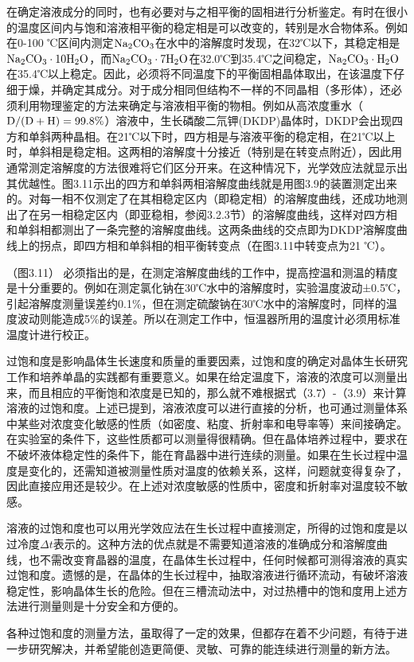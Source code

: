 在确定溶液成分的同时，也有必要对与之相平衡的固相进行分析鉴定。有时在很小的温度区间内与饱和溶液相平衡的稳定相是可以改变的，转别是水合物体系。例如在0-100 ℃区间内测定$\rm Na_2CO_3$在水中的溶解度时发现，在32℃以下，其稳定相是$\rm Na_2CO_3\cdot 10H_2O$，而$\rm Na_2CO_3\cdot 7H_2O$在32.0℃到35.4℃之间稳定，$\rm Na_2CO_3\cdot H_2O$在35.4℃以上稳定。因此，必须将不同温度下的平衡固相晶体取出，在该温度下仔细于燥，并确定其成分。对于成分相同但结构不一样的不同晶相（多形体），还必须利用物理鉴定的方法来确定与溶液相平衡的物相。例如从高浓度重水（$\rm D/(D+H)=99.8\%$）溶液中，生长磷酸二氘钾(DKDP)晶体时，DKDP会出现四方和单斜两种晶相。在21℃以下时，四方相是与溶液平衡的稳定相，在21℃以上时，单斜相是稳定相。这两相的溶解度十分接近（特别是在转变点附近），因此用通常测定溶解度的方法很难将它们区分开来。在这种情况下，光学效应法就显示出其优越性。图3.11示出的四方和单斜两相溶解度曲线就是用图3.9的装置测定出来的。对每一相不仅测定了在其相稳定区内（即稳定相）的溶解度曲线，还成功地测出了在另一相稳定区内（即亚稳相，参阅3.2.3节）的溶解度曲线，这样对四方相和单斜相都测出了一条完整的溶解度曲线。这两条曲线的交点即为DKDP溶解度曲线上的拐点，即四方相和单斜相的相平衡转变点（在图3.11中转变点为21 ℃）。

（图3.11）
必须指出的是，在测定溶解度曲线的工作中，提高控温和测温的精度是十分重要的。例如在测定氯化钠在30℃水中的溶解度时，实验温度波动±0.5℃，引起溶解度测量误差约0.1\%，但在测定硫酸钠在30℃水中的溶解度时，同样的温度波动则能造成5\%的误差。所以在测定工作中，恒温器所用的温度计必须用标准温度计进行校正。

过饱和度是影响晶体生长速度和质量的重要因素，过饱和度的确定对晶体生长研究工作和培养单晶的实践都有重要意义。如果在给定温度下，溶液的浓度可以测量出来，而且相应的平衡饱和浓度是已知的，那么就不难根据式（3.7）-（3.9）来计算溶液的过饱和度。上述已提到，溶液浓度可以进行直接的分析，也可通过测量体系中某些对浓度变化敏感的性质（如密度、粘度、折射率和电导率等）来间接确定。在实验室的条件下，这些性质都可以测量得很精确。但在晶体培养过程中，要求在不破坏液体稳定性的条件下，能在育晶器中进行连续的测量。如果在生长过程中温度是变化的，还需知道被测量性质对温度的依赖关系，这样，问题就变得复杂了，因此直接应用还是较少。在上述对浓度敏感的性质中，密度和折射率对温度较不敏感。

溶液的过饱和度也可以用光学效应法在生长过程中直接测定，所得的过饱和度是以过冷度$\Delta t$表示的。这种方法的优点就是不需要知道溶液的准确成分和溶解度曲线，也不需改变育晶器的温度，在晶体生长过程中，任何时候都可测得溶液的真实过饱和度。遗憾的是，在晶体的生长过程中，抽取溶液进行循环流动，有破坏溶液稳定性，影响晶体生长的危险。但在三槽流动法中，对过热槽中的饱和度用上述方法进行测量则是十分安全和方便的。

各种过饱和度的测量方法，虽取得了一定的效果，但都存在着不少问题，有待于进一步研究解决，并希望能创造更简便、灵敏、可靠的能连续进行测量的新方法。